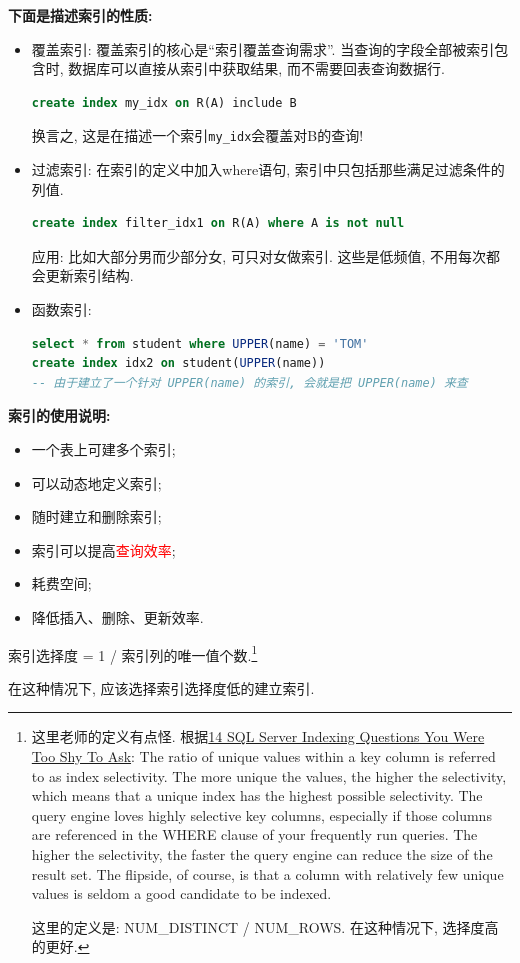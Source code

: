 \textbf{下面是描述索引的性质:}
\begin{itemize}
  \item 覆盖索引: 覆盖索引的核心是“索引覆盖查询需求”. 当查询的字段全部被索引包含时, 数据库可以直接从索引中获取结果, 而不需要回表查询数据行.
  \begin{lstlisting}[language=SQL]
create index my_idx on R(A) include B
  \end{lstlisting}
  换言之, 这是在描述一个索引\verb|my_idx|会覆盖对B的查询!
  \item 过滤索引: 在索引的定义中加入where语句, 索引中只包括那些满足过滤条件的列值.
  \begin{lstlisting}[language=SQL]
create index filter_idx1 on R(A) where A is not null
  \end{lstlisting}
  应用: 比如大部分男而少部分女, 可只对女做索引. 这些是低频值, 不用每次都会更新索引结构.
  \item 函数索引: 
  \begin{lstlisting}[language=SQL]
select * from student where UPPER(name) = 'TOM'
create index idx2 on student(UPPER(name))
-- 由于建立了一个针对 UPPER(name) 的索引, 会就是把 UPPER(name) 来查
  \end{lstlisting}
\end{itemize}

\textbf{索引的使用说明:}
\begin{itemize}
  \item 一个表上可建多个索引;
  \item 可以动态地定义索引;
  \item 随时建立和删除索引;
  \item 索引可以提高\textcolor{red}{查询效率};
  \item 耗费空间;
  \item 降低插入、删除、更新效率.
\end{itemize}

\begin{definition}[索引选择度]
  索引选择度 = 1 / 索引列的唯一值个数.\footnote{这里老师的定义有点怪. 根据\hyperlink{https://www.red-gate.com/simple-talk/databases/sql-server/performance-sql-server/14-sql-server-indexing-questions-you-were-too-shy-to-ask/}{14 SQL Server Indexing Questions You Were Too Shy To Ask}: The ratio of unique values within a key column is referred to as index selectivity. The more unique the values, the higher the selectivity, which means that a unique index has the highest possible selectivity. The query engine loves highly selective key columns, especially if those columns are referenced in the WHERE clause of your frequently run queries. The higher the selectivity, the faster the query engine can reduce the size of the result set. The flipside, of course, is that a column with relatively few unique values is seldom a good candidate to be indexed.
  
  这里的定义是: NUM\_DISTINCT / NUM\_ROWS. 在这种情况下, 选择度高的更好.}

  在这种情况下, 应该选择索引选择度低的建立索引.
\end{definition}

